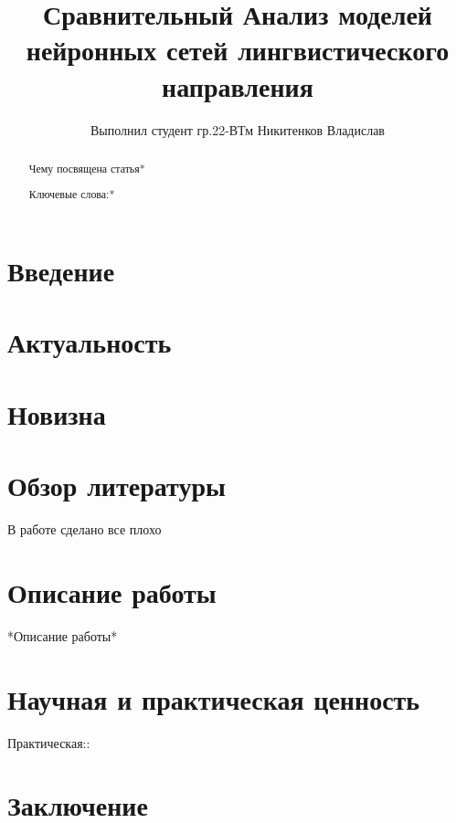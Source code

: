 \documentclass{article}
\title{Сравнительный Анализ моделей нейронных сетей лингвистического направления}
\author{Выполнил студент гр.22-ВТм Никитенков Владислав}
\begin{document}
\maketitle

\begin{abstract}
Чему посвящена статья*

Ключевые слова:*
\end{abstract}

\section{Введение}
\section{Актуальность}
\section{Новизна}
\section{Обзор литературы}
В работе \cite{greenwade93} сделано все плохо
\section{Описание работы}
*Описание работы*
\section{Научная и практическая ценность}
Практическая::
\section{Заключение}




\end{document}
